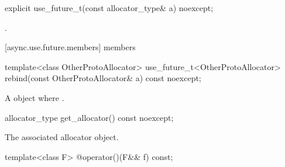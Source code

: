 \begin{itemdecl}
explicit use_future_t(const allocator_type& a) noexcept;
\end{itemdecl}

\begin{itemdescr}
\pnum
\postconditions {}.
\end{itemdescr}



[async.use.future.members]{ members}

%
\begin{itemdecl}
template<class OtherProtoAllocator> use_future_t<OtherProtoAllocator>
  rebind(const OtherProtoAllocator& a) const noexcept;
\end{itemdecl}

\begin{itemdescr}
\pnum
\returns A  object where .
\end{itemdescr}

%
\begin{itemdecl}
allocator_type get_allocator() const noexcept;
\end{itemdecl}

\begin{itemdescr}
\pnum
\returns The associated allocator object.
\end{itemdescr}

%
\begin{itemdecl}
template<class F> @\unspec@ operator()(F&& f) const;
\end{itemdecl}

